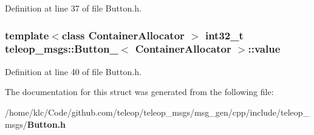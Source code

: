 Definition at line 37 of file Button.h.

\subsubsection[{value}]{\setlength{\rightskip}{0pt plus 5cm}template$<$class ContainerAllocator $>$ int32\_\-t {\bf teleop\_\-msgs::Button\_\-}$<$ ContainerAllocator $>$::{\bf value}}\label{structteleop__msgs_1_1Button___a41c16ae821d72bb241d7c16dc8a98fe8}


Definition at line 40 of file Button.h.



The documentation for this struct was generated from the following file:\begin{DoxyCompactItemize}
\item 
/home/klc/Code/github.com/teleop/teleop\_\-msgs/msg\_\-gen/cpp/include/teleop\_\-msgs/{\bf Button.h}\end{DoxyCompactItemize}
